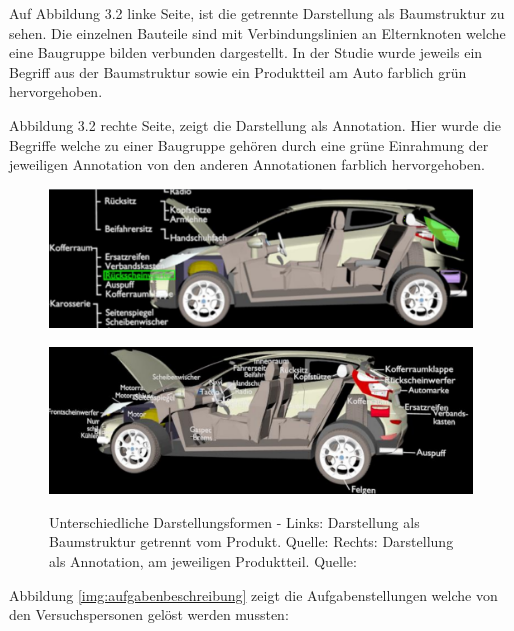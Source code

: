 Auf Abbildung 3.2 linke Seite, ist die getrennte Darstellung als Baumstruktur zu sehen. Die einzelnen Bauteile sind mit Verbindungslinien an Elternknoten welche eine Baugruppe bilden verbunden dargestellt. In der Studie wurde jeweils ein Begriff aus der Baumstruktur sowie ein Produktteil am Auto farblich grün hervorgehoben. 

Abbildung 3.2 rechte Seite, zeigt die Darstellung als Annotation. Hier wurde die Begriffe welche zu einer Baugruppe gehören durch eine grüne Einrahmung der jeweiligen Annotation von den anderen 
Annotationen farblich hervorgehoben.  

\begin{figure}[H]
	\centering
	\begin{minipage}{.5\textwidth}
		\centering
		\includegraphics[width=.95\linewidth]{resources/analyse/baumstruktur.png}
		\label{fig:baum}
	\end{minipage}%
	\begin{minipage}{.5\textwidth}
		\centering
		\includegraphics[width=.95\linewidth]{resources/analyse/annotation.png}
		\label{fig:annotation}
	\end{minipage}
\caption{Unterschiedliche Darstellungsformen - Links: Darstellung als Baumstruktur getrennt vom Produkt. Quelle: \cite[S.~127]{Brandenburg2019} Rechts: Darstellung als Annotation, am jeweiligen Produktteil. Quelle: \cite[S.~128]{Brandenburg2019}}
\label{img:versuchAbbildung}
\end{figure}

Abbildung \ref{img:aufgabenbeschreibung} zeigt die Aufgabenstellungen welche von den Versuchspersonen gelöst werden mussten:

